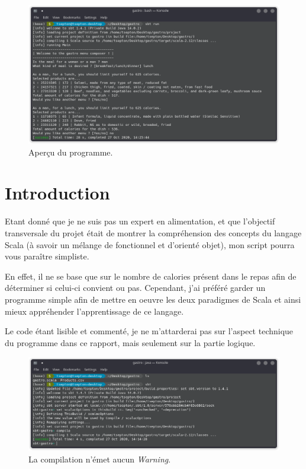 \vfill
\begin{figure}[H]
    \centering
    \includegraphics[width=1\textwidth]{parts/pics/2.png}
    \caption{Aperçu du programme.}
    \label{fig:my_label}
\end{figure}

\newpage
\section{Introduction}
Etant donné que je ne suis pas un expert en alimentation, et que l'objectif transversale du projet était de montrer la compréhension des concepts du langage Scala (à savoir un mélange de fonctionnel et d'orienté objet), mon script pourra vous paraître simpliste. 

En effet, il ne se base que sur le nombre de calories présent dans le repas afin de déterminer si celui-ci convient ou pas. Cependant, j'ai préféré garder un programme simple afin de mettre en oeuvre les deux paradigmes de Scala et ainsi mieux appréhender l'apprentissage de ce langage. 

Le code étant lisible et commenté, je ne m'attarderai pas sur l'aspect technique du programme dans ce rapport, mais seulement sur la partie logique.

\begin{figure}[H]
    \centering
    \includegraphics[width=1\textwidth]{parts/pics/1.png}
    \caption{La compilation n'émet aucun \textit{Warning}.}
    \label{fig:my_label}
\end{figure}